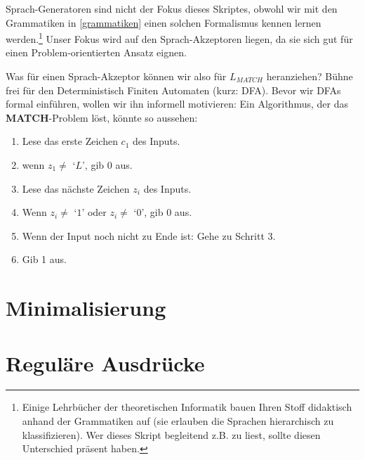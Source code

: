 Sprach-Generatoren sind nicht der Fokus dieses Skriptes, obwohl wir mit den Grammatiken
in \autoref{grammatiken} einen solchen Formalismus kennen lernen werden.\footnote{
Einige Lehrbücher der theoretischen Informatik bauen Ihren Stoff didaktisch anhand der Grammatiken
auf (sie erlauben die Sprachen hierarchisch zu klassifizieren).
Wer dieses Skript begleitend z.B. zu \cite{schoening} liest,
sollte diesen Unterschied präsent haben.}
Unser Fokus wird auf den Sprach-Akzeptoren liegen,
da sie sich gut für einen Problem-orientierten Ansatz eignen.

Was für einen Sprach-Akzeptor können wir also für $L_{MATCH}$ heranziehen?
Bühne frei für den Deterministisch Finiten Automaten (kurz: DFA).
Bevor wir DFAs formal einführen, wollen wir ihn informell motivieren: 
Ein Algorithmus, der das \textbf{MATCH}-Problem löst, könnte so aussehen:
\begin{enumerate}
    \item Lese das erste Zeichen $c_1$ des Inputs.
    \item wenn $z_1 \neq $ `$L$', gib 0 aus.
    \item Lese das nächste Zeichen $z_i$ des Inputs.
    \item Wenn $z_i \neq $ `$1$' oder $z_i \neq $ `$0$', gib 0 aus.
    \item Wenn der Input noch nicht zu Ende ist: Gehe zu Schritt 3.
    \item Gib 1 aus.
\end{enumerate}
\section{Minimalisierung}
\section{Reguläre Ausdrücke}


